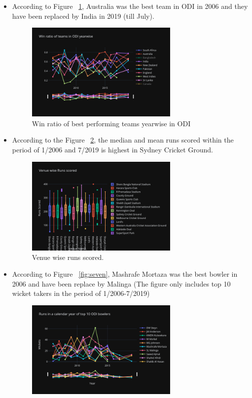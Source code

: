\documentclass[fleqn,10pt]{wlscirep}
\begin{document}
\begin{itemize}
      \item According to Figure ~\ref{fig:five}, Australia was the best team in ODI in 2006 and they have been replaced by India in 2019 (till July).
      \begin{figure}[H]
        \centering
        \includegraphics[width=0.7\textwidth]{winteams.png}
        \caption{Win ratio of best performing teams yearwise in ODI}
        \label{fig:five}
      \end{figure}
      \item According to the Figure ~\ref{fig:six}, the median and mean runs scored within the period of 1/2006 and 7/2019 is highest in Sydney Cricket Ground.
      \begin{figure}[H]
        \centering
        \includegraphics[width=0.7\textwidth]{venueruns.png}
        \caption{Venue wise runs scored.}
        \label{fig:six}
      \end{figure}
      \item According to Figure ~\ref{fig:seven}, Mashrafe Mortaza was the best bowler in 2006 and have been replace by Malinga (The figure only includes top 10 wicket takers in the period of 1/2006-7/2019)
      \begin{figure}[H]
        \centering
        \includegraphics[width=0.7\textwidth]{wicbowlers.png}

\end{figure}
\end{itemize}
\end{document}
